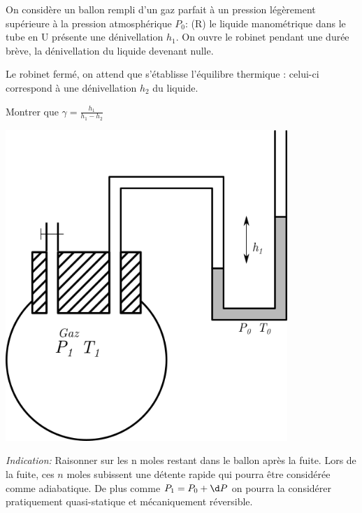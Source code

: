 \begin{Exercise}[title=(*) Expérience de Clément-Desorme détermination de $\gamma$]
	\begin{minipage}{0.45\linewidth}
On considère un ballon rempli d’un gaz parfait à un pression légèrement supérieure à la pression atmosphérique $P_0$:
(R)	le liquide manométrique dans le tube en U présente une dénivellation $h_1$. On ouvre le robinet pendant une durée brève, la dénivellation du liquide devenant nulle.

Le robinet fermé, on attend que s’établisse l’équilibre thermique : celui-ci correspond à une dénivellation $h_2$ du liquide.

Montrer que $\gamma = \frac{h_1}{h_1-h_2}$
	\end{minipage}\hspace*{0.05\linewidth}
	\begin{minipage}{0.45\linewidth}
		\includegraphics[width=0.8\textwidth]{../fig/calculgamma.png}
	\end{minipage}

	\emph{Indication:} Raisonner sur les n moles restant dans le ballon après la fuite. Lors de la fuite, ces $n$ moles subissent une détente rapide qui pourra être considérée comme adiabatique. De plus comme	$P_1 =  P_0 + \d P$ on pourra la considérer pratiquement quasi-statique et mécaniquement réversible.
\end{Exercise}
